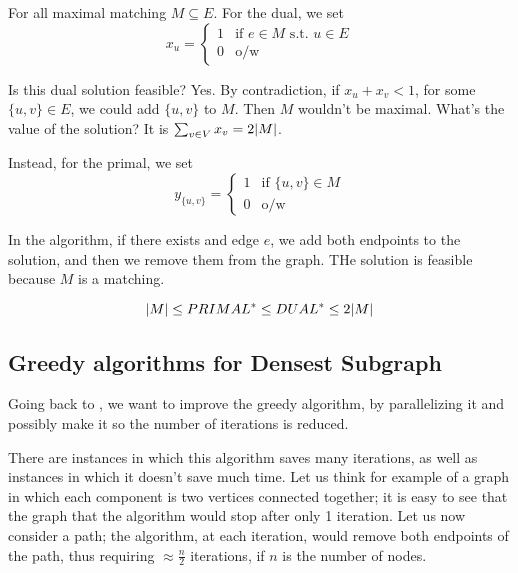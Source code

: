     For all maximal matching $M \subseteq E$. For the dual, we set
    \begin{equation}
        x_u = 
        \begin{cases}
            1 & \text{if } e \in M \text{ s.t. } u \in E\\
            0 & \text{o/w}
        \end{cases}
    \end{equation}

    Is this dual solution feasible? Yes.
    By contradiction, if $x_u + x_v < 1$, for some $\{u,v\} \in E$, we could add $\{u,v\}$ to $M$. Then $M$ wouldn't be maximal.
    What's the value of the solution? It is $\sum_{v \in V} x_v = 2 \vert M \vert$.

    Instead, for the primal, we set
    \begin{equation}
        y_{\{u,v\}} = 
        \begin{cases}
            1 & \text{if } \{u,v\} \in M\\
            0 & \text{o/w}
        \end{cases}
    \end{equation}

    In the algorithm, if there exists and edge $e$, we add both endpoints to the solution, and then we remove them from the graph.
    THe solution is feasible because $M$ is a matching.

    \[ \vert M \vert \leq PRIMAL^* \leq DUAL^* \leq 2 \vert M \vert \]


\subsection{Greedy algorithms for Densest Subgraph}

    Going back to , we want to improve the greedy algorithm, by parallelizing it and possibly make it so the number of iterations is reduced.

    

    There are instances in which this algorithm saves many iterations, as well as instances in which it doesn't save much time. Let us think for example of a graph in which each component is two vertices connected together; it is easy to see that the graph that the algorithm would stop after only 1 iteration.
    Let us now consider a path; the algorithm, at each iteration, would remove both endpoints of the path, thus requiring $\approx \frac{n}{2}$ iterations, if $n$ is the number of nodes.

